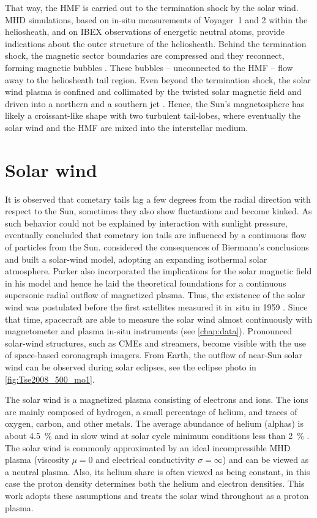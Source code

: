 That way, the HMF is carried out to the termination shock by the solar wind. MHD simulations, based on in-situ measurements of Voyager~1 and 2 within the heliosheath, and on IBEX observations of energetic neutral atoms, provide indications about the outer structure of the heliosheath. Behind the termination shock, the magnetic sector boundaries are compressed and they reconnect, forming magnetic bubbles \citep{Opher2011}. These bubbles -- unconnected to the HMF -- flow away to the heliosheath tail region. Even beyond the termination shock, the solar wind plasma is confined and collimated by the twisted solar magnetic field and driven into a northern and a southern jet \citep{Opher2015}. Hence, the Sun's magnetosphere has likely a croissant-like shape with two turbulent tail-lobes, where eventually the solar wind and the HMF are mixed into the interstellar medium.


\section{Solar wind}
\label{sec:solar_wind}
It is observed that cometary tails lag a few degrees from the radial direction with respect to the Sun, sometimes they also show fluctuations and become kinked. As such behavior could not be explained by interaction with sunlight pressure, eventually \citet{Biermann1951} concluded that cometary ion tails are influenced by a continuous flow of particles from the Sun.	%
\citet{Parker1958} considered the consequences of Biermann's conclusions and built a solar-wind model, adopting an expanding isothermal solar atmosphere. Parker also incorporated the implications for the solar magnetic field in his model and hence he laid the theoretical foundations for a continuous supersonic radial outflow of magnetized plasma. Thus, the existence of the solar wind was postulated before the first satellites measured it in~situ in 1959 \citep{Gringauz1960,Neugebauer1966}. Since that time, spacecraft are able to measure the solar wind almost continuously with magnetometer and plasma in-situ instruments (see \autoref{chap:data}). Pronounced solar-wind structures, such as CMEs and streamers, become visible with the use of space-based coronagraph imagers. From Earth, the outflow of near-Sun solar wind can be observed during solar eclipses, see the eclipse photo in \autoref{fig:Tse2008_500_mo1}.

The solar wind is a magnetized plasma consisting of electrons and ions. The ions are mainly composed of hydrogen, a small percentage of helium, and traces of oxygen, carbon, and other metals. The average abundance of helium (alphas) is about \SI{4.5}{\%} and in slow wind at solar cycle minimum conditions less than \SI{2}{\%} \citep{Feldman1978,Schwenn1983,Kasper2012}.
The solar wind is commonly approximated by an ideal incompressible MHD plasma (viscosity $\mu = 0$ and electrical conductivity $\sigma = \infty$) and can be viewed as a neutral plasma. Also, its helium share is often viewed as being constant, in this case the proton density determines both the helium and electron densities. This work adopts these assumptions and treats the solar wind throughout as a proton plasma.

